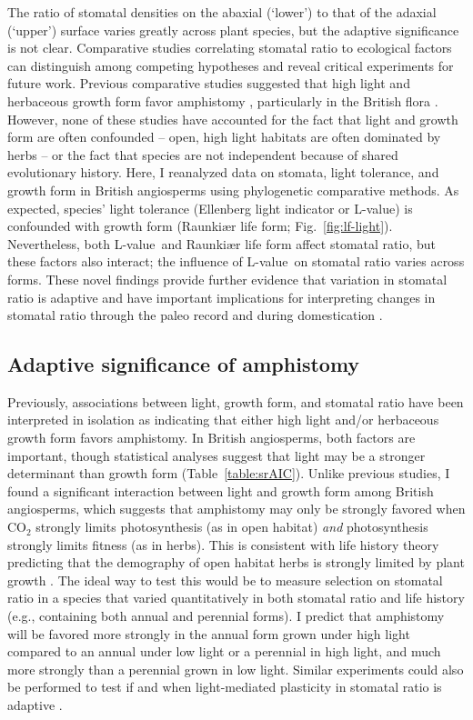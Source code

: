 \documentclass[12pt, oneside]{article}
\newcommand{\el}{L-value}
\begin{document}
The ratio of stomatal densities on the abaxial (`lower') to that of the adaxial (`upper') surface varies greatly across plant species, but the adaptive significance is not clear. Comparative studies correlating stomatal ratio to ecological factors can distinguish among competing hypotheses and reveal critical experiments for future work. Previous comparative studies suggested that high light and herbaceous growth form favor amphistomy \citep{Mott_etal_1982, Jordan_etal_2014, Muir_2015, Bucher_etal_2017}, particularly in the British flora \citep{Salisbury_1927, Peat_Fitter_1994b}. However, none of these studies have accounted for the fact that light and growth form are often confounded -- open, high light habitats are often dominated by herbs -- or the fact that species are not independent because of shared evolutionary history. Here, I reanalyzed data on stomata, light tolerance, and growth form in British angiosperms using phylogenetic comparative methods. As expected, species' light tolerance (Ellenberg light indicator or \el) is confounded with growth form (Raunki\ae r life form; Fig.~\ref{fig:lf-light}). Nevertheless, both \el~and Raunki\ae r life form affect stomatal ratio, but these factors also interact; the influence of \el~on stomatal ratio varies across forms. These novel findings provide further evidence that variation in stomatal ratio is adaptive and have important implications for interpreting changes in stomatal ratio through the paleo record \citep{Jordan_etal_2014} and during domestication \citep{Milla_etal_2013}.

\subsection*{Adaptive significance of amphistomy}

Previously, associations between light, growth form, and stomatal ratio have been interpreted in isolation as indicating that either high light and/or herbaceous growth form favors amphistomy. In British angiosperms, both factors are important, though statistical analyses suggest that light may be a stronger determinant than growth form (Table~\ref{table:srAIC}). Unlike previous studies, I found a significant interaction between light and growth form among British angiosperms, which suggests that amphistomy may only be strongly favored when CO$_2$ strongly limits photosynthesis (as in open habitat) \textit{and} photosynthesis strongly limits fitness (as in herbs). This is consistent with life history theory predicting that the demography of open habitat herbs is strongly limited by plant growth \citep{Franco_Silvertown_1996}. The ideal way to test this would be to measure selection on stomatal ratio in a species that varied quantitatively in both stomatal ratio and life history (e.g., containing both annual and perennial forms). I predict that amphistomy will be favored more strongly in the annual form grown under high light compared to an annual under low light or a perennial in high light, and much more strongly than a perennial grown in low light. Similar experiments could also be performed to test if and when light-mediated plasticity in stomatal ratio is adaptive \citep{Gay_Hurd_1975, Mott_Michaelson_1991, Fontana_etal_2017}.
\end{document}

